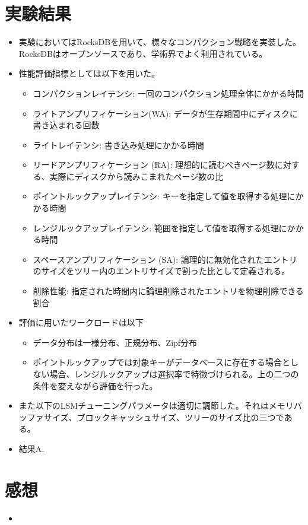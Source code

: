 \documentclass[dvipdfmx,uplatex]{jsarticle}
\theoremstyle{remark}
\newenvironment{experiment}[1]{
    \begin{tcolorbox}[
        colframe=violet,
        colback=violet!10!white,
        colbacktitle=violet!40!white,
        coltitle=black,
        fonttitle=\bfseries,
        title={#1}
    ]
}{
    \end{tcolorbox}
}
\newenvironment{kansou}{
    \begin{tcolorbox}[
        colframe=brown,
        colback=brown!10!white,
        colbacktitle=brown!40!white,
        coltitle=black,fonttitle=\bfseries
    ]
}{
    \end{tcolorbox}
}
\begin{document}
\section{実験結果}
\begin{experiment}{実験手法}
\begin{itemize}
    \item 実験においてはRocksDBを用いて、様々なコンパクション戦略を実装した。RocksDBはオープンソースであり、学術界でよく利用されている。
    \item 性能評価指標としては以下を用いた。
    \begin{itemize}
        \item コンパクションレイテンシ: 一回のコンパクション処理全体にかかる時間
        \item ライトアンプリフィケーション(WA): データが生存期間中にディスクに書き込まれる回数
        \item ライトレイテンシ: 書き込み処理にかかる時間
        \item リードアンプリフィケーション (RA): 理想的に読むべきページ数に対する、実際にディスクから読みこまれたページ数の比
        \item ポイントルックアップレイテンシ: キーを指定して値を取得する処理にかかる時間
        \item レンジルックアップレイテンシ: 範囲を指定して値を取得する処理にかかる時間
        \item スペースアンプリフィケーション (SA): 論理的に無効化されたエントリのサイズをツリー内のエントリサイズで割った比として定義される。
        \item 削除性能: 指定された時間内に論理削除されたエントリを物理削除できる割合
    \end{itemize}
    \item 評価に用いたワークロードは以下
    \begin{itemize}
        \item データ分布は一様分布、正規分布、Zipf分布
        \item ポイントルックアップでは対象キーがデータベースに存在する場合としない場合、レンジルックアップは選択率で特徴づけられる。上の二つの条件を変えながら評価を行った。
    \end{itemize}
    \item また以下のLSMチューニングパラメータは適切に調節した。それはメモリバッファサイズ、ブロックキャッシュサイズ、ツリーのサイズ比の三つである。
\end{itemize}
\end{experiment}

\begin{experiment}{実験結果}
\begin{itemize}
    \item 結果A.
\end{itemize}
\end{experiment}

\section{感想}
\begin{kansou}
\begin{itemize}
  \item 
\end{itemize}
\end{kansou}



\end{document}
